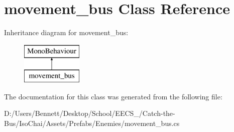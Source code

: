 \hypertarget{classmovement__bus}{}\section{movement\+\_\+bus Class Reference}
\label{classmovement__bus}
Inheritance diagram for movement\+\_\+bus\+:\begin{figure}[H]
\begin{center}
\leavevmode
\includegraphics[height=2.000000cm]{classmovement__bus}
\end{center}
\end{figure}


The documentation for this class was generated from the following file\+:\begin{DoxyCompactItemize}
\item 
D\+:/\+Users/\+Bennett/\+Desktop/\+School/\+E\+E\+C\+S\+\_/\+Catch-\/the-\/\+Bus/\+Iso\+Chai/\+Assets/\+Prefabs/\+Enemies/movement\+\_\+bus.\+cs\end{DoxyCompactItemize}
